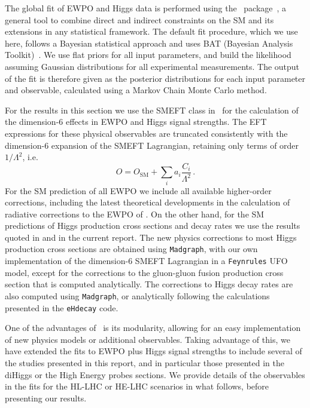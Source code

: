 The global fit of EWPO and Higgs data is performed using the
\HEPfit~package~\cite{hepfitsite}, a general tool to combine direct
and indirect constraints on the SM and its extensions in any
statistical framework.  The default fit procedure, which we use here,
follows a Bayesian statistical approach and uses BAT (Bayesian
Analysis Toolkit)~\cite{Caldwell:2008fw}. We use flat priors for all
input parameters, and build the likelihood assuming Gaussian
distributions for all experimental measurements. The output of the fit
is therefore given as the posterior distributions for each input
parameter and observable, calculated using a Markov Chain Monte
Carlo method.

For the results in this section we use the SMEFT class in \HEPfit~for 
the calculation of the dimension-6 effects in EWPO and Higgs signal strengths.
The EFT expressions for these physical observables are truncated
consistently with the dimension-6 expansion of the SMEFT Lagrangian, 
retaining only terms of order
$1/\Lambda^2$, i.e.
%
\begin{equation}
O=O_{\mathrm{SM}} + \sum_i a_i \frac{C_i}{\Lambda^2}\,.
\end{equation}
%
For the SM prediction of
all EWPO we include all available higher-order corrections, including the latest
theoretical developments in the calculation of radiative corrections
to the EWPO of \cite{Dubovyk:2016aqv,Dubovyk:2018rlg}.
On the other hand,  for the SM predictions of
Higgs production cross sections and decay rates we use the results
quoted in \cite{deFlorian:2016spz} and in the current report. 
The new physics corrections to most
Higgs production cross sections are obtained using {\tt Madgraph},
with our own implementation of the dimension-6 SMEFT Lagrangian in a
{\tt Feynrules} UFO model, except for the corrections to the
gluon-gluon fusion production cross section that is computed
analytically. The corrections to Higgs decay rates are
also computed using {\tt Madgraph}, or analytically following
the calculations presented in the {\tt eHdecay} code.

One of the advantages of \HEPfit~is its modularity, allowing for an
easy implementation of new physics models or additional observables.
Taking advantage of this, we have extended the fits to EWPO plus Higgs 
signal strengths to include several of the studies presented in this report, 
and in particular those presented in the diHiggs or the High Energy probes sections.
We provide details of the observables in the fits for the HL-LHC or HE-LHC 
scenarios in what follows, before presenting our results.

